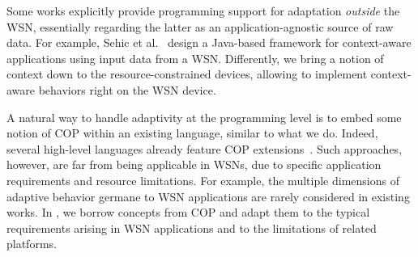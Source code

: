
 Some works explicitly
provide programming support for adaptation \emph{outside} the WSN,
essentially regarding the latter as an application-agnostic source of
raw data. For example, Sehic et al.~\cite{Sehic11} design a Java-based
framework for context-aware applications using input data from a
WSN. Differently, we bring a notion of context down to the
resource-constrained devices, allowing to implement context-aware
behaviors right on the WSN device.

A natural way to handle adaptivity at the programming level is to
embed some notion of COP within an existing language, similar to what
we do. Indeed, several high-level languages already feature COP
extensions~\cite{Bardram05,Ghezzi10,Kamina11,Salvaneschi12,Sehic11}.
Such approaches, however, are far from being applicable in WSNs, due
to specific application requirements and resource limitations. For
example, the multiple dimensions of adaptive behavior germane to WSN
applications are rarely considered in existing works. In \conesc, we
borrow concepts from COP and adapt them to the typical requirements
arising in WSN applications and to the limitations of related
platforms.



